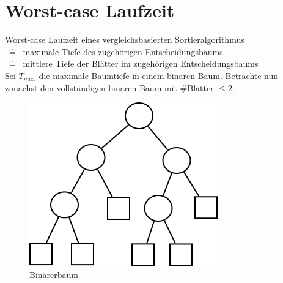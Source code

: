 \pagebreak
\section{Worst-case Laufzeit}
Worst-case Laufzeit eines vergleichsbasierten Sortieralgorithmus \\$~\hat{=}~$ maximale Tiefe des zugehörigen Entscheidungsbaums \\$~\hat{=}~$ mittlere Tiefe der Blätter im zugehörigen Entscheidungsbaums\\

Sei $T_{max}$ die maximale Baumtiefe in einem binären Baum. 
Betrachte nun zunächst den vollständigen binären Baum mit \#Blätter $\leq 2$. \\


\begin{figure}
\vspace{-50pt}
\includegraphics[width=\linewidth]{09/Grafik/img1.png}
\caption{Binärerbaum}
\end{figure}

\vspace{30pt}

